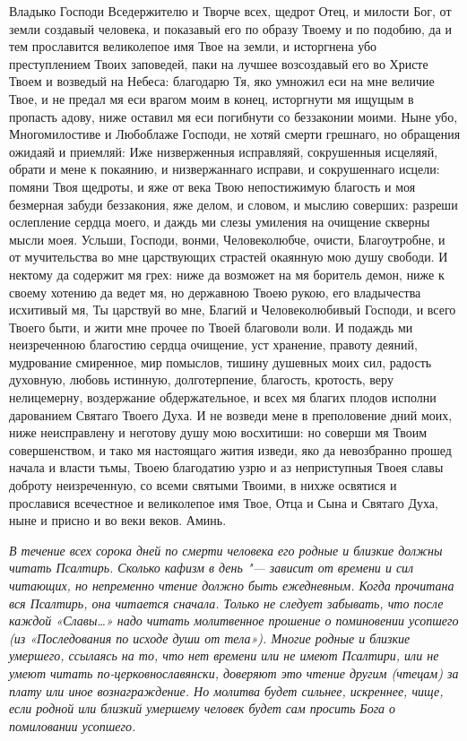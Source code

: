 Владыко Господи Вседержителю и Творче всех, щедрот Отец, и милости Бог, от земли создавый человека, и показавый его по образу Твоему и по подобию, да и тем прославится великолепое имя Твое на земли, и исторгнена убо преступлением Твоих заповедей, паки на лучшее возсоздавый его во Христе Твоем и возведый на Небеса: благодарю Тя, яко умножил еси на мне величие Твое, и не предал мя еси врагом моим в конец, исторгнути мя ищущым в пропасть адову, ниже оставил мя еси погибнути со беззаконии моими. Ныне убо, Многомилостиве и Любоблаже Господи, не хотяй смерти грешнаго, но обращения ожидаяй и приемляй: Иже низверженныя исправляяй, сокрушенныя исцеляяй, обрати и мене к покаянию, и низвержаннаго исправи, и сокрушеннаго исцели: помяни Твоя щедроты, и яже от века Твою непостижимую благость и моя безмерная забуди беззакония, яже делом, и словом, и мыслию соверших: разреши ослепление сердца моего, и даждь ми слезы умиления на очищение скверны мысли моея. Усльши, Господи, вонми, Человеколюбче, очисти, Благоутробне, и от мучительства во мне царствующих страстей окаянную мою душу свободи. И нектому да содержит мя грех: ниже да возможет на мя боритель демон, ниже к своему хотению да ведет мя, но державною Твоею рукою, его владычества исхитивый мя, Ты царствуй во мне, Благий и Человеколюбивый Господи, и всего Твоего быти, и жити мне прочее по Твоей благоволи воли. И подаждь ми неизреченною благостию сердца очищение, уст хранение, правоту деяний, мудрование смиренное, мир помыслов, тишину душевных моих сил, радость духовную, любовь истинную, долготерпение, благость, кротость, веру нелицемерну, воздержание обдержательное, и всех мя благих плодов исполни дарованием Святаго Твоего Духа. И не возведи мене в преполовение дний моих, ниже неисправлену и неготову душу мою восхитиши: но соверши мя Твоим совершенством, и тако мя настоящаго жития изведи, яко да невозбранно прошед начала и власти тьмы, Твоею благодатию узрю и аз неприступныя Твоея славы доброту неизреченную, со всеми святыми Твоими, в нихже освятися и прославися всечестное и великолепое имя Твое, Отца и Сына и Святаго Духа, ныне и присно и во веки веков. Аминь.
\mychapterending

 


\itshape В течение всех сорока дней по смерти человека его родные и близкие должны читать Псалтирь. Сколько кафизм в день "--- зависит от времени и сил читающих, но непременно чтение должно быть ежедневным. Когда прочитана вся Псалтирь, она читается сначала. Только не следует забывать, что после каждой «Славы…» надо читать молитвенное прошение о поминовении усопшего (из «Последования по исходе души от тела»). Многие родные и близкие умершего, ссылаясь на то, что нет времени или не имеют Псалтири, или не умеют читать по-церковнославянски, доверяют это чтение другим (чтецам) за плату или иное вознаграждение. Но молитва будет сильнее, искреннее, чище, если родной или близкий умершему человек будет сам просить Бога о помиловании усопшего. 

